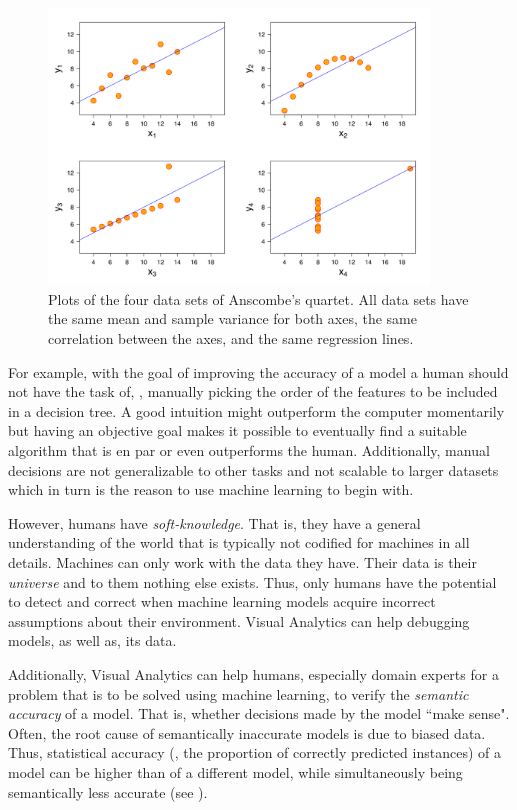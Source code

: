 \begin{figure}[t]
\centering
\includegraphics[width=0.9\textwidth,valign=t]{tex/introduction/anscombe.png}
\caption[Anscombe's quartet.]{
Plots of the four data sets of Anscombe's quartet\footnotemark. All data sets have the same mean and sample variance for both axes, the same correlation between the axes, and the same regression lines.
}
\label{figs:anscombe}
\end{figure}

For example, with the goal of improving the accuracy of a model a human should not have the task of, \eg, manually picking the order of the features to be included in a decision tree.
A good intuition might outperform the computer momentarily but having an objective goal makes it possible to eventually find a suitable algorithm that is en par or even outperforms the human.
Additionally, manual decisions are not generalizable to other tasks and not scalable to larger datasets which in turn is the reason to use machine learning to begin with.

However, humans have \emph{soft-knowledge}.
That is, they have a general understanding of the world that is typically not codified for machines in all details.
Machines can only work with the data they have.
Their data is their \emph{universe} and to them nothing else exists.
Thus, only humans have the potential to detect and correct when machine learning models acquire incorrect assumptions about their environment.
Visual Analytics can help debugging models, as well as, its data.

Additionally, Visual Analytics can help humans, especially domain experts for a problem that is to be solved using machine learning, to verify the \emph{semantic accuracy} of a model.
That is, whether decisions made by the model ``make sense".
Often, the root cause of semantically inaccurate models is due to biased data.
Thus, statistical accuracy (\ie, the proportion of correctly predicted instances) of a model can be higher than of a different model, while simultaneously being semantically less accurate (see \cite{Caruana:2015:IMH:2783258.2788613,explainer}).

